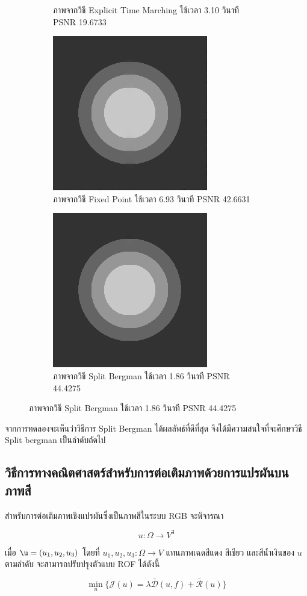 \documentclass[hidelinks,a4paper,14pt]{article}
\numberwithin{equation}{section}							%
\begin{document}
{\begin{figure}[H]
\begin{subfigure}{0.3\linewidth}
			\caption{ภาพจากวิธี Explicit Time Marching ใช้เวลา 3.10 วินาที PSNR 19.6733}
		\end{subfigure}
		\begin{subfigure}{0.3\linewidth}
			\centering
			\includegraphics[width=0.3\linewidth]{images/grayscale_inpaint/result_fixpoint.png}
			\caption{ภาพจากวิธี Fixed Point ใช้เวลา 6.93 วินาที PSNR 42.6631}
		\end{subfigure}
		\begin{subfigure}{0.3\linewidth}
			\centering
			\includegraphics[width=0.3\linewidth]{images/grayscale_inpaint/result_splitbergman.png}
				\caption{ภาพจากวิธี Split Bergman ใช้เวลา 1.86 วินาที PSNR 44.4275}
		\end{subfigure}
		\end{figure}
			
			จากการทดลองจะเห็นว่าวิธีการ Split Bergman ได้ผลลัพธ์ที่ดีที่สุด จึงได้มีความสนใจที่จะศึกษาวิธี Split bergman เป็นลำดับถัดไป
			
			\subsection{วิธีการทางคณิตศาสตร์สำหรับการต่อเติมภาพด้วยการแปรผันบนภาพสี} 

			สำหรับการต่อเติมภาพเชิงแปรผันซึ่งเป็นภาพสีในระบบ RGB จะพิจารณา
			
			$$ u: \Omega  \rightarrow V^3 $$

			เมื่อ $\u=(u_1,u_2,u_3)$ โดยที่ $u_1,u_2,u_3: \Omega  \rightarrow V$ แทนภาพเฉดสีแดง สีเขียว และสีน้ำเงินของ $u$ ตามลำดับ จะสามารถปรับปรุงตัวแบบ ROF ได้ดังนี้
			
			$$\min_{u} \{ \mathcal{J}(u)= \lambda \mathcal{\bar{D}}(u,f)+  \mathcal{\bar{R}}(u) \}$$
			
}
\end{document}
